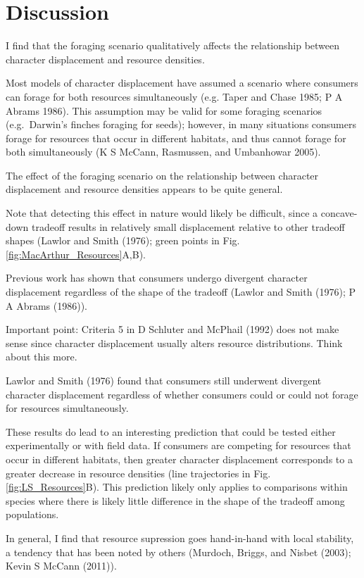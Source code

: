 \documentclass[11pt,]{article}
\begin{document}
\section{Discussion}\label{discussion}

I find that the foraging scenario qualitatively affects the relationship
between character displacement and resource densities.

Most models of character displacement have assumed a scenario where
consumers can forage for both resources simultaneously (e.g. Taper and
Chase 1985; P A Abrams 1986). This assumption may be valid for some
foraging scenarios (e.g.~Darwin's finches foraging for seeds); however,
in many situations consumers forage for resources that occur in
different habitats, and thus cannot forage for both simultaneously (K S
McCann, Rasmussen, and Umbanhowar 2005).

The effect of the foraging scenario on the relationship between
character displacement and resource densities appears to be quite
general.

Note that detecting this effect in nature would likely be difficult,
since a concave-down tradeoff results in relatively small displacement
relative to other tradeoff shapes (Lawlor and Smith (1976); green points
in Fig. \ref{fig:MacArthur_Resources}A,B).

Previous work has shown that consumers undergo divergent character
displacement regardless of the shape of the tradeoff (Lawlor and Smith
(1976); P A Abrams (1986)).

Important point: Criteria 5 in D Schluter and McPhail (1992) does not
make sense since character displacement usually alters resource
distributions. Think about this more.

Lawlor and Smith (1976) found that consumers still underwent divergent
character displacement regardless of whether consumers could or could
not forage for resources simultaneously.

These results do lead to an interesting prediction that could be tested
either experimentally or with field data. If consumers are competing for
resources that occur in different habitats, then greater character
displacement corresponds to a greater decrease in resource densities
(line trajectories in Fig. \ref{fig:LS_Resources}B). This prediction
likely only applies to comparisons within species where there is likely
little difference in the shape of the tradeoff among populations.

In general, I find that resource supression goes hand-in-hand with local
stability, a tendency that has been noted by others (Murdoch, Briggs,
and Nisbet (2003); Kevin S McCann (2011)).
\end{document}
